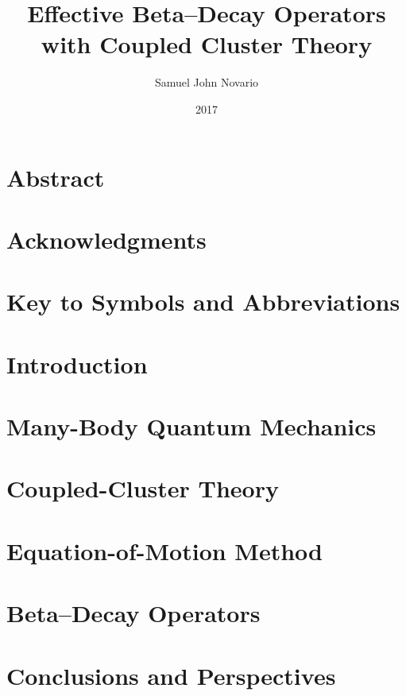 \documentclass[dissertation]{msudissertation}
\author{Samuel John Novario}
\title{Effective Beta--Decay Operators with Coupled Cluster Theory}
\date{2017}
\begin{document}
\frontmatter
\maketitle


\chapter{Abstract}


\chapter{Acknowledgments}


\tableofcontents
\listoftables
\listoffigures

\chapter{Key to Symbols and Abbreviations}


\mainmatter

\chapter{Introduction} \label{chapter:introduction}


\chapter{Many-Body Quantum Mechanics} \label{chapter:manybody}


\chapter{Coupled-Cluster Theory} \label{chapter:cc}


\chapter{Equation-of-Motion Method} \label{chapter:eom}


\chapter{Beta--Decay Operators} \label{chapter:betadecay}


\chapter{Conclusions and Perspectives} \label{chapter:conclusions}


\appendix



\renewcommand{\bibname}{References}

\end{document}
